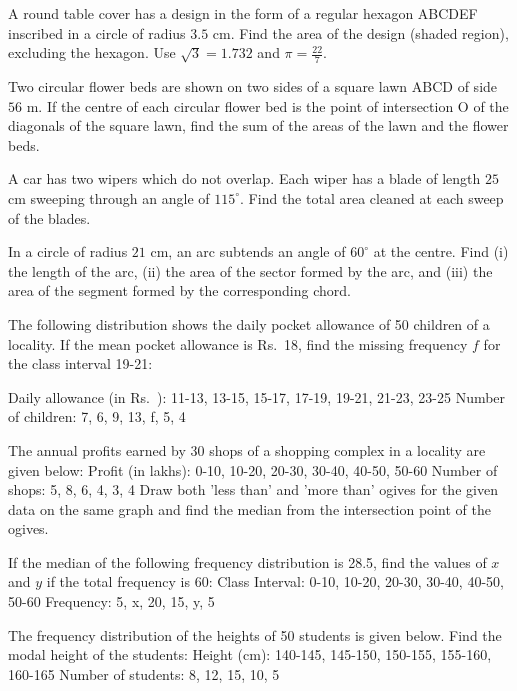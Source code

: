 \documentclass[12pt,a4paper]{exam}
\begin{document}
\begin{questions}
\question[5] A round table cover has a design in the form of a regular hexagon ABCDEF inscribed in a circle of radius $3.5$ cm. Find the area of the design (shaded region), excluding the hexagon. Use $\sqrt{3} = 1.732$ and $\pi = \frac{22}{7}$.
\vspace{0.15cm}

\question[5] Two circular flower beds are shown on two sides of a square lawn ABCD of side $56$ m. If the centre of each circular flower bed is the point of intersection O of the diagonals of the square lawn, find the sum of the areas of the lawn and the flower beds.
\vspace{0.15cm}

\question[5] A car has two wipers which do not overlap. Each wiper has a blade of length $25$ cm sweeping through an angle of $115^\circ$. Find the total area cleaned at each sweep of the blades.
\vspace{0.15cm}

\question[5] In a circle of radius $21$ cm, an arc subtends an angle of $60^\circ$ at the centre. Find (i) the length of the arc, (ii) the area of the sector formed by the arc, and (iii) the area of the segment formed by the corresponding chord.
\vspace{0.15cm}

\question[5] The following distribution shows the daily pocket allowance of 50 children of a locality. If the mean pocket allowance is Rs.~18, find the missing frequency $f$ for the class interval 19-21: 

Daily allowance (in Rs.~): 11-13, 13-15, 15-17, 17-19, 19-21, 21-23, 23-25 
Number of children: 7, 6, 9, 13, f, 5, 4
\vspace{0.15cm}

\question[5] The annual profits earned by 30 shops of a shopping complex in a locality are given below: 
Profit (in lakhs): 0-10, 10-20, 20-30, 30-40, 40-50, 50-60 
Number of shops: 5, 8, 6, 4, 3, 4 
Draw both 'less than' and 'more than' ogives for the given data on the same graph and find the median from the intersection point of the ogives.
\vspace{0.15cm}

\question[5] If the median of the following frequency distribution is 28.5, find the values of $x$ and $y$ if the total frequency is 60: 
Class Interval: 0-10, 10-20, 20-30, 30-40, 40-50, 50-60 
Frequency: 5, x, 20, 15, y, 5
\vspace{0.15cm}

\question[5] The frequency distribution of the heights of 50 students is given below. Find the modal height of the students: 
Height (cm): 140-145, 145-150, 150-155, 155-160, 160-165 
Number of students: 8, 12, 15, 10, 5
\vspace{0.15cm}

\end{questions}
\bigskip
\end{document}
